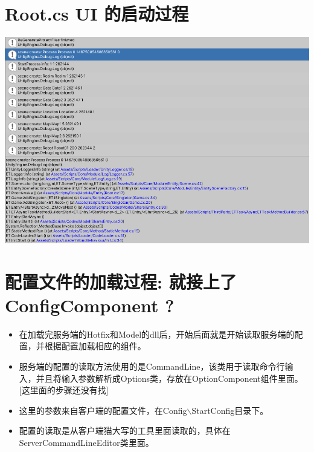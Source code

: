 \documentclass[9pt, b5paper]{article}
\begin{document}
\section{Root.cs UI 的启动过程}
\label{sec-13}

\includegraphics[width=.9\linewidth]{./pic/readme_20230125_092445.png}
\section{配置文件的加载过程:  就接上了ConfigComponent ?}
\label{sec-14}
\begin{itemize}
\item 在加载完服务端的Hotfix和Model的dll后，开始后面就是开始读取服务端的配置，并根据配置加载相应的组件。
\item 服务端的配置的读取方法使用的是CommandLine，该类用于读取命令行输入，并且将输入参数解析成Options类，存放在OptionComponent组件里面。[这里面的步骤还没有找]
\item 这里的参数来自客户端的配置文件，在Config$\backslash$StartConfig目录下。
\item 配置的读取是从客户端猫大写的工具里面读取的，具体在ServerCommandLineEditor类里面。
\end{itemize}
\end{document}
